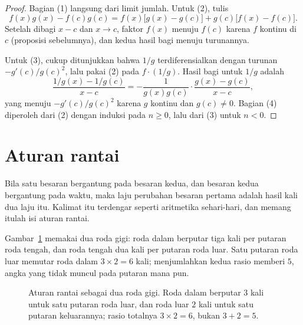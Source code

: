 \begin{proof}
Bagian (1) langsung dari limit jumlah. Untuk (2), tulis
\[
  f(x)g(x)-f(c)g(c)=f(x)\bigl[g(x)-g(c)\bigr]+g(c)\bigl[f(x)-f(c)\bigr].
\]
Setelah dibagi $x-c$ dan $x\to c$, faktor $f(x)$ menuju $f(c)$ karena $f$ kontinu di $c$
(proposisi sebelumnya), dan kedua hasil bagi menuju turunannya.

Untuk (3), cukup ditunjukkan bahwa $1/g$ terdiferensialkan dengan turunan $-g'(c)/g(c)^{2}$,
lalu pakai (2) pada $f\cdot(1/g)$. Hasil bagi untuk $1/g$ adalah
\[
  \frac{1/g(x)-1/g(c)}{x-c}
  =-\frac{1}{g(x)g(c)}\cdot\frac{g(x)-g(c)}{x-c},
\]
yang menuju $-g'(c)/g(c)^{2}$ karena $g$ kontinu dan $g(c)\neq0$. Bagian (4) diperoleh dari
(2) dengan induksi pada $n\ge0$, lalu dari (3) untuk $n<0$.
\end{proof}

\section{Aturan rantai}

Bila satu besaran bergantung pada besaran kedua, dan besaran kedua bergantung pada waktu,
maka laju perubahan besaran pertama adalah hasil kali dua laju itu. Kalimat itu terdengar
seperti aritmetika sehari-hari, dan memang itulah isi aturan rantai.

Gambar~\ref{fig:roda-gigi} memakai dua roda gigi: roda dalam berputar tiga kali per putaran
roda tengah, dan roda tengah dua kali per putaran roda luar. Satu putaran roda luar memutar
roda dalam $3\times2=6$ kali; menjumlahkan kedua rasio memberi $5$, angka yang tidak muncul
pada putaran mana pun.

\begin{figure}[htbp]
\centering
{}
\caption{Aturan rantai sebagai dua roda gigi. Roda dalam berputar $3$ kali untuk satu putaran
roda luar, dan roda luar $2$ kali untuk satu putaran keluarannya; rasio totalnya
$3\times2=6$, bukan $3+2=5$.}
\label{fig:roda-gigi}
\end{figure}

